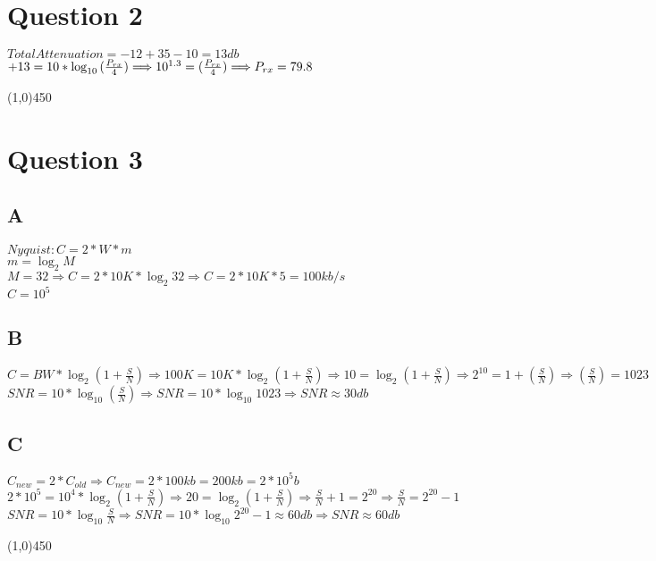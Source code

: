\documentclass[a4paper,12pt]{article}
\begin{document}
\section {Question 2 }
\begin{doublespace}
$Total Attenuation = -12 + 35 - 10 = 13 db $ \\
$+13 = 10 * \log_{10} {(\frac {P_{rx}}{4})}  \Longrightarrow 10^{1.3} = (\frac {P_{rx}}{4}) \Longrightarrow P_{rx} = 79.8 $
\end{doublespace}
\line(1,0){450}
\section {Question 3 }

\subsection{A}
\begin{doublespace}
$Nyquist : C = 2 * W * m $ \\
$m = \log_2 {M}$\\
$M = 32 \Longrightarrow C = 2 * 10 K * \log_{2} {32}  \Longrightarrow C = 2 * 10K * 5 = 100 kb/s$\\
$C = 10^5$
\end{doublespace}



\subsection{B}
\begin{doublespace}
$C = BW * \log_2 {(1 + \frac{S}{N} )}  \Longrightarrow 100K = 10K * \log_2 {(1 + \frac{S}{N}) }  \Longrightarrow 10 = \log_2 {(1 + \frac{S}{N}) } \Longrightarrow 2^{10} = 1 + (\frac{S}{N}) \Longrightarrow (\frac{S}{N}) = 1023 $\\
$SNR = 10 * \log_{10} (\frac {S}{N}) \Longrightarrow SNR = 10 * \log_{10}{1023} \Longrightarrow SNR \approx 30 db$
\end{doublespace}


\subsection{C}
\begin{doublespace}
$C_{new} = 2 * C_{old} \Longrightarrow C_{new} = 2 * 100kb = 200kb = 2 * 10^5 b$\\
$2 * 10^5 = 10^4 * \log_2 {(1 + \frac{S}{N} ) } \Longrightarrow 20 = \log_2 {(1 + \frac{S}{N} )} \Longrightarrow \frac{S}{N} + 1 = 2 ^{20} \Longrightarrow \frac{S}{N} = 2^{20} - 1 $\\
$SNR = 10 * \log_{10}{\frac{S}{N}} \Longrightarrow SNR = 10 * \log_{10}{2^{20} - 1 } \approx 60 db  \Longrightarrow SNR \approx 60 db$

\end{doublespace}
\line(1,0){450}
\end{document}
